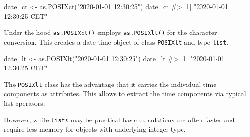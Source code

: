\documentclass[
]{krantz}
\makeatletter
\newenvironment{Shaded}{\begin{snugshade}}{\end{snugshade}}
\newcommand{\CommentTok}[1]{\textcolor[rgb]{0.56,0.35,0.01}{\textit{#1}}}
\newcommand{\KeywordTok}[1]{\textcolor[rgb]{0.13,0.29,0.53}{\textbf{#1}}}
\newcommand{\NormalTok}[1]{#1}
\newcommand{\OperatorTok}[1]{\textcolor[rgb]{0.81,0.36,0.00}{\textbf{#1}}}
\newcommand{\StringTok}[1]{\textcolor[rgb]{0.31,0.60,0.02}{#1}}
\newenvironment{kframe}{%
\medskip{}
\setlength{\fboxsep}{.8em}
 \def\at@end@of@kframe{}%
 \ifinner\ifhmode%
  \def\at@end@of@kframe{\end{minipage}}%
  \begin{minipage}{\columnwidth}%
 \fi\fi%
 \def\FrameCommand##1{\hskip\@totalleftmargin \hskip-\fboxsep
 \colorbox{shadecolor}{##1}\hskip-\fboxsep
     \hskip-\linewidth \hskip-\@totalleftmargin \hskip\columnwidth}%
 \MakeFramed {\advance\hsize-\width
   \@totalleftmargin\z@ \linewidth\hsize
   \@setminipage}}%
 {\par\unskip\endMakeFramed%
 \at@end@of@kframe}
\renewenvironment{Shaded}{\begin{kframe}}{\end{kframe}}
\renewcommand{\KeywordTok} [1]{\textcolor[rgb]{0.00,0.44,0.13}{{#1}}}
\renewcommand{\StringTok}  [1]{\textcolor[rgb]{0.25,0.44,0.63}{{#1}}}
\renewcommand{\CommentTok} [1]{\textcolor[rgb]{0.38,0.63,0.69}{{#1}}}
\renewcommand{\NormalTok}  [1]{{#1}}
\makeatother
\begin{document}
\begin{Shaded}
\begin{Highlighting}[]
\NormalTok{date_ct <-}\StringTok{ }\KeywordTok{as.POSIXct}\NormalTok{(}\StringTok{"2020-01-01 12:30:25"}\NormalTok{)}
\NormalTok{date_ct}
\CommentTok{#> [1] "2020-01-01 12:30:25 CET"}
\end{Highlighting}
\end{Shaded}

Under the hood \texttt{as.POSIXct()} employs \texttt{as.POSIXlt()} for the character conversion. This creates a date time object of class \texttt{POSIXlt} and type \texttt{list}.

\begin{Shaded}
\begin{Highlighting}[]
\NormalTok{date_lt <-}\StringTok{ }\KeywordTok{as.POSIXlt}\NormalTok{(}\StringTok{"2020-01-01 12:30:25"}\NormalTok{)}
\NormalTok{date_lt}
\CommentTok{#> [1] "2020-01-01 12:30:25 CET"}
\end{Highlighting}
\end{Shaded}

The \texttt{POSIXlt} class has the advantage that it carries the individual time components as attributes. This allows to extract the time components via typical list operators.

\begin{Shaded}
\end{Shaded}

However, while \texttt{lists} may be practical basic calculations are often faster and require less memory for objects with underlying integer type.
\end{document}
